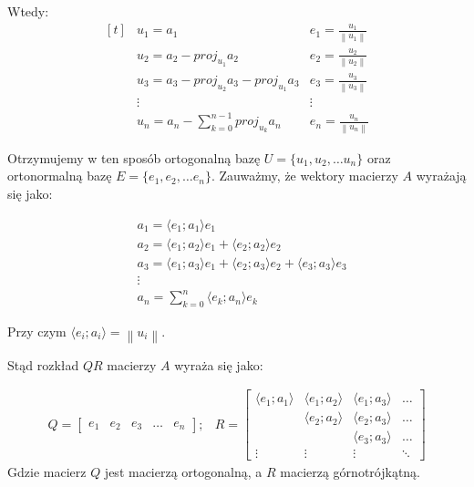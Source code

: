 \documentclass[11pt,wide]{mwart}
\newcommand{\norm}[1]{\left\lVert#1\right\rVert}
\begin{document}
Wtedy:
\begin{equation*}
\begin{aligned}[t]
& u_1 = a_1                                     & e_1 = \frac{u_1}{\norm{u_1}} \\
& u_2 = a_2 - proj_{u_1} a_2                    & e_2 = \frac{u_2}{\norm{u_2}} \\
& u_3 = a_3 - proj_{u_2} a_3 - proj_{u_1} a_3   & e_3 = \frac{u_3}{\norm{u_3}} \\
& \vdots                                        & \vdots \\
& u_n = a_n - \sum_{k = 0}^{n-1} proj_{u_k}a_n  & e_n = \frac{u_n}{\norm{u_n}}
\end{aligned}
\end{equation*}

Otrzymujemy w ten sposób ortogonalną bazę $U = \{u_1, u_2, \dots u_n\}$ oraz ortonormalną bazę  $E = \{e_1, e_2, \dots e_n\}$. Zauważmy, że wektory macierzy $A$ wyrażają się jako:

\begin{equation*}
\begin{aligned}
& a_1 = \langle e_1; a_1 \rangle e_1 \\
& a_2 = \langle e_1; a_2 \rangle e_1 + \langle e_2; a_2 \rangle e_2 \\
& a_3 = \langle e_1; a_3 \rangle e_1 + \langle e_2; a_3 \rangle e_2 + \langle e_3; a_3 \rangle e_3 \\
& \vdots \\
& a_n = \sum_{k = 0}^n \langle e_k; a_n \rangle e_k
\end{aligned}
\end{equation*}

Przy czym $ \langle e_i; a_i \rangle = \norm{u_i}$.

Stąd rozkład $QR$ macierzy $A$ wyraża się jako:

\begin{equation}
\begin{aligned}
Q = \begin{bmatrix} e_1 & e_2 & e_3 & \dots & e_n \end{bmatrix};
& R = \begin{bmatrix} 
\langle e_1; a_1 \rangle & \langle e_1; a_2 \rangle & \langle e_1; a_3 \rangle & \dots \\
                         & \langle e_2; a_2 \rangle & \langle e_2; a_3 \rangle & \dots \\
                         &                          & \langle e_3; a_3 \rangle & \dots \\
\vdots & \vdots & \vdots & \ddots
\end{bmatrix}
\end{aligned}
\end{equation}
Gdzie macierz $Q$ jest macierzą ortogonalną, a $R$ macierzą górnotrójkątną.
\end{document}
